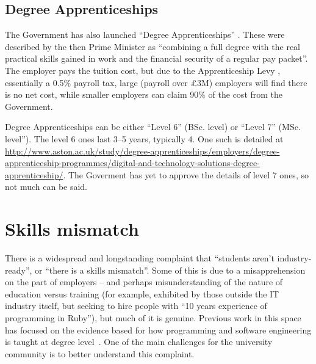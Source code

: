 \documentclass[sigconf,anonymous]{acmart}
\begin{document}

\subsection{Degree Apprenticeships}\label{sec:DA}

The Government has also launched ``Degree Apprenticeships''
\cite{BIS2015a}. These were described by the then Prime Minister as
``combining a full degree with the real practical skills gained in
work and the financial security of a regular pay packet''. The
employer pays the tuition cost, but due to the Apprenticeship Levy
\cite{HMRC2016a}, essentially a 0.5\% payroll tax, large (payroll over \pounds3M) employers will find there is no net cost, while smaller employers can claim 90\% of the cost from the Government.

Degree Apprenticeships can be either ``Level 6'' (BSc. level) or ``Level 7'' (MSc. level''). The level 6 ones last 3--5 years, typically 4. One such is detailed at \url{http://www.aston.ac.uk/study/degree-apprenticeships/employers/degree-apprenticeship-programmes/digital-and-technology-solutions-degree-apprenticeship/}. The Goverment has yet to approve the details of level 7 ones, so not much can be said.

\section{Skills mismatch}\label{sec:Skills}

There is a widespread and longstanding complaint that ``students
aren't industry-ready'', or ``there is a skills mismatch''. Some of
this is due to a misapprehension on the part of employers -- and
perhaps misunderstanding of the nature of education versus training
(for example, exhibited by those outside the IT industry itself, but
seeking to hire people with ``10 years experience of programming in
Ruby''), but much of it is genuine. Previous work in this space has
focused on the evidence based for how programming and software
engineering is taught at degree
level~\cite{davenport-et-al:latice2016,murphy-et-al:programming2017,simon-et-al:sigcse2018}. One
of the main challenges for the university community is to better
understand this complaint.
\end{document}
